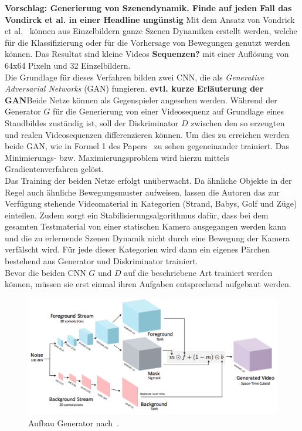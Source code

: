 \documentclass[times, 11pt,twocolumn]{article}
\begin{document}
\textbf{Vorschlag: Generierung von Szenendynamik. Finde auf jeden Fall das Vondirck et al. in einer Headline ungünstig}
 \label{sec:Vondrick}
Mit dem Ansatz von Vondrick et al.~\cite{VondrickPT16} können aus Einzelbildern ganze Szenen Dynamiken erstellt werden, welche für die Klassifizierung oder für die Vorhersage von Bewegungen genutzt werden können. Das Resultat sind kleine Videos \textbf{Sequenzen?} mit einer Auflösung von 64x64 Pixeln und 32 Einzelbildern. \\
Die Grundlage für dieses Verfahren bilden zwei CNN, die als \textit{Generative Adversarial Networks} (GAN) \cite{NIPS2014_5423} fungieren. \textbf{evtl. kurze Erläuterung der GAN}Beide Netze können als Gegenspieler angesehen werden. Während der Generator $G$ für die Generierung von einer Videosequenz auf Grundlage eines Standbildes zuständig ist, soll der Diskriminator $D$ zwischen den so erzeugten und realen Videosequenzen differenzieren können. Um dies zu erreichen werden beide GAN, wie in Formel 1 des Papers~\cite{VondrickPT16} zu sehen gegeneinander trainiert. Das Minimierungs- bzw. Maximierungsproblem wird hierzu mittels Gradientenverfahren gelöst. \\
Das Training der beiden Netze erfolgt unüberwacht. Da ähnliche Objekte in der Regel auch ähnliche Bewegungsmuster aufweisen, lassen die Autoren das zur Verfügung stehende Videomaterial in Kategorien (Strand, Babys, Golf und Züge) einteilen. Zudem sorgt ein Stabilisierungsalgorithmus dafür, dass bei dem gesamten Testmaterial von einer statischen Kamera ausgegangen werden kann und die zu erlernende Szenen Dynamik nicht durch eine Bewegung der Kamera verfälscht wird. Für jede dieser Kategorien wird dann ein eigenes Pärchen bestehend aus Generator und Diskriminator trainiert. \\
Bevor die beiden CNN $G$ und $D$ auf die beschriebene Art trainiert werden können, müssen sie erst einmal ihren Aufgaben entsprechend aufgebaut werden. \\
\begin{figure}
	\flushleft
	\includegraphics[width=\columnwidth]{Bilder/generator2.jpg}
	\caption{Aufbau Generator nach~\cite{VondrickPT16}.}
	\label{fig:generator}
\end{figure}
\end{document}
